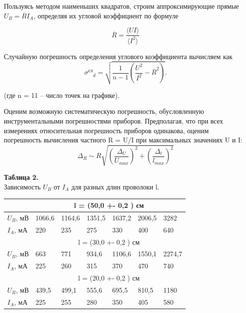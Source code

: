 Пользуясь методом наименьших квадратов, строим аппроксимирующие прямые $U_{B} = \overline{R}I_{A}$, определяя их угловой коэффициент по формуле


\[\overline{R} = \frac{\langle UI \rangle}{\langle I^2 \rangle}\]


Случайную погрешность определения углового коэффициента вычисляем как
\[\sigma{^{сл}}{_{\overline{d}}} = \sqrt{\frac{1}{n-1}\left(\frac{U^2}{I^2} - \overline{R}^2\right)}.\]


(где n = 11 – число точек на графике).


Оценим возможную систематическую погрешность, обусловленную инструментальными
погрешностями приборов. Предполагая, что при всех измерениях относительная погрешность приборов одинакова, оценим погрешность вычисления частного R = U/I при максимальных
значениях U и I:
\[\Delta{_{R}} \sim R \sqrt{\left(\frac{\Delta{_{U}}}{U_{max}}\right)^2 + \left( \frac{\Delta{_{l}}}{l_{max}}\right)^2}\]


\begin{flushleft}
{\scriptsize \textbf{Таблица 2.}\\Зависимость $U_{B}$ от $I_{A}$ для разных длин проволоки l.}
\end{flushleft}




\begin{table}[h]
\centering
\begin{tabular}{|l|l|l|l|l|l|l|}
\hline
      & \multicolumn{6}{c|}{l = (50,0 +- 0,2 ) см}          \\ \hline
$U_B$, мВ & 1066,6 & 1164,6 & 1351,5 & 1637,2 & 2006,5 & 3282   \\ \hline
$I_A$, мА & 220    & 235    & 275    & 330    & 400    & 640    \\ \hline
      & \multicolumn{6}{c|}{l = (30,0 +- 0,2 ) см}          \\ \hline
$U_B$, мВ & 663    & 771    & 934,6  & 1106,6 & 1550,1 & 2274,7 \\ \hline
$I_A$, мА & 225    & 260    & 315    & 370    & 470    & 740    \\ \hline
      & \multicolumn{6}{c|}{l = (20,0 +- 0,2 ) см}          \\ \hline
$U_B$, мВ & 439,5  & 499,1  & 555,6  & 695,5  & 810,5  & 1180   \\ \hline
$I_A$, мА & 225    & 255    & 280    & 350    & 405    & 580    \\ \hline
\end{tabular}
\end{table}


